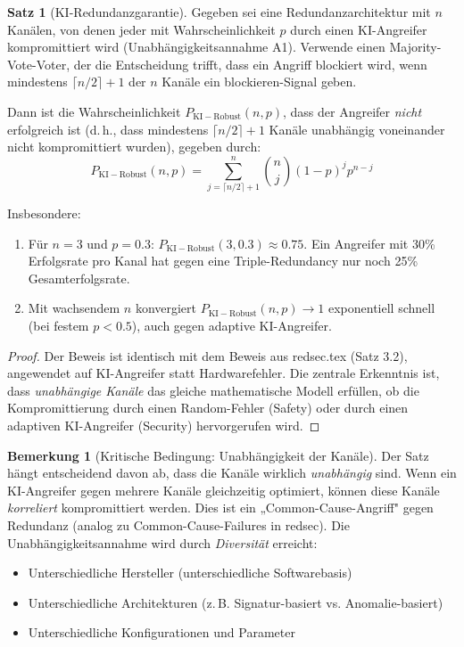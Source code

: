 \documentclass[a4paper,12pt]{article}
\theoremstyle{definition}
\newtheorem{satz}{Satz}
\newtheorem{bemerkung}{Bemerkung}
\begin{document}
\begin{satz}[KI-Redundanzgarantie]
\label{satz:ki_redundanzgarantie}
Gegeben sei eine Redundanzarchitektur mit $n$ Kanälen, von denen jeder mit Wahrscheinlichkeit $p$ durch einen KI-Angreifer kompromittiert wird (Unabhängigkeitsannahme A1). Verwende einen Majority-Vote-Voter, der die Entscheidung trifft, dass ein Angriff blockiert wird, wenn mindestens $\lceil n/2 \rceil + 1$ der $n$ Kanäle ein blockieren-Signal geben.

Dann ist die Wahrscheinlichkeit $P_{\mathrm{KI-Robust}}(n,p)$, dass der Angreifer \emph{nicht} erfolgreich ist (d.\,h., dass mindestens $\lceil n/2 \rceil + 1$ Kanäle unabhängig voneinander nicht kompromittiert wurden), gegeben durch:
\begin{equation}
P_{\mathrm{KI-Robust}}(n,p) = \sum_{j = \lceil n/2 \rceil + 1}^{n} \binom{n}{j} (1-p)^j p^{n-j}
\end{equation}

Insbesondere:
\begin{enumerate}
	\item Für $n = 3$ und $p = 0.3$: $P_{\mathrm{KI-Robust}}(3, 0.3) \approx 0.75$. Ein Angreifer mit 30\% Erfolgsrate pro Kanal hat gegen eine Triple-Redundancy nur noch 25\% Gesamterfolgsrate.
	\item Mit wachsendem $n$ konvergiert $P_{\mathrm{KI-Robust}}(n,p) \to 1$ exponentiell schnell (bei festem $p < 0.5$), auch gegen adaptive KI-Angreifer.
\end{enumerate}
\end{satz}

\begin{proof}
Der Beweis ist identisch mit dem Beweis aus redsec.tex (Satz 3.2), angewendet auf KI-Angreifer statt Hardwarefehler. Die zentrale Erkenntnis ist, dass \emph{unabhängige Kanäle} das gleiche mathematische Modell erfüllen, ob die Kompromittierung durch einen Random-Fehler (Safety) oder durch einen adaptiven KI-Angreifer (Security) hervorgerufen wird.
\end{proof}

\begin{bemerkung}[Kritische Bedingung: Unabhängigkeit der Kanäle]
Der Satz hängt entscheidend davon ab, dass die Kanäle wirklich \emph{unabhängig} sind. Wenn ein KI-Angreifer gegen mehrere Kanäle gleichzeitig optimiert, können diese Kanäle \emph{korreliert} kompromittiert werden. Dies ist ein „Common-Cause-Angriff" gegen Redundanz (analog zu Common-Cause-Failures in redsec). Die Unabhängigkeitsannahme wird durch \emph{Diversität} erreicht:
\begin{itemize}
	\item Unterschiedliche Hersteller (unterschiedliche Softwarebasis)
	\item Unterschiedliche Architekturen (z.\,B. Signatur-basiert vs. Anomalie-basiert)
	\item Unterschiedliche Konfigurationen und Parameter
\end{itemize}
\end{bemerkung}
\end{document}
